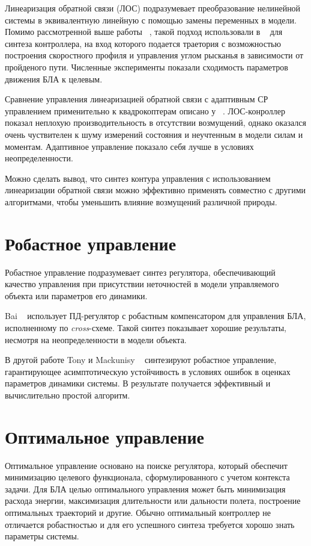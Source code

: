 Линеаризация обратной связи (ЛОС) подразумевает преобразование нелинейной системы в эквивалентную линейную с помощью замены переменных в модели. Помимо рассмотренной выше работы ~\cite{Palunko01}, такой подход использовали в ~\cite{Roza01} для синтеза контроллера, на вход которого подается траетория с возможностью построения скоростного профиля и управления углом рысканья в зависимости от пройденого пути. Численные эксперименты показали сходимость параметров движения БЛА к целевым.

Сравнение управления линеаризацией обратной связи с адаптивным СР управлением применительно к квадрокоптерам описано у ~\cite{Lee01}. ЛОС-конроллер показал неплохую производительность в отсутствии возмущений, однако оказался очень чуствителен к шуму измерений состояния и неучтенным в модели силам и моментам. Адаптивное управление показало себя лучше в условиях неопределенности.

Можно сделать вывод, что синтез контура управления с использованием линеаризации обратной связи можно эффективно применять совместно с другими алгоритмами, чтобы уменьшить влияние возмущений различной природы.

\section{Робастное управление}

Робастное управление подразумевает синтез регулятора, обеспечивающий качество управления при присутствии неточностей в модели управляемого объекта или параметров его динамики.

Bai ~\cite{Bai01} использует ПД-регулятор с робастным компенсатором для управления БЛА, исполненному по \textit{cross}-схеме. Такой синтез показывает хорошие результаты, несмотря на неопределенности в модели объекта.

В другой работе Tony и Mackunisy ~\cite{Tony01} синтезируют робастное управление, гарантирующее асимптотическую устойчивость в условиях ошибок в оценках параметров динамики системы. В результате получается эффективный и вычислительно простой алгоритм.

\section{Оптимальное управление}

Оптимальное управление основано на поиске регулятора, который обеспечит минимизацию целевого функционала, сформулированного с учетом контекста задачи. Для БЛА целью оптимального управления может быть минимизация расхода энергии, максимизация длительности или дальности полета, построение оптимальных траекторий и другие. Обычно оптимальный контроллер не отличается робастностью и для его успешного синтеза требуется хорошо знать параметры системы. 


